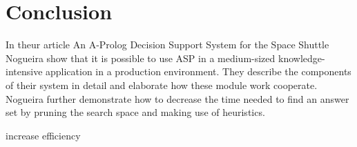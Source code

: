 \documentclass[runningheads]{llncs}
\newcommand{\papertitle}{An A-Prolog Decision Support System for the Space Shuttle}
\newcommand{\authorquote}{Nogueira \etal}
\begin{document}
\section{Conclusion} \label{sec:conclusion}

In theur article \papertitle{} \authorquote{} show that it is possible to use ASP in a medium-sized knowledge-intensive application in a production environment. They describe the components of their system in detail and elaborate how these module work cooperate. \authorquote{} further demonstrate how to decrease the time needed to find an answer set by pruning the search space and making use of heuristics. 

increase efficiency 




\end{document}
